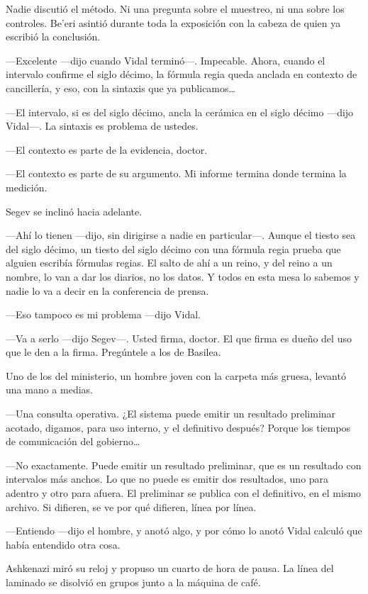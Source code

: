 Nadie discutió el método. Ni una pregunta sobre el muestreo, ni una sobre los controles. Be'eri asintió durante toda la exposición con la cabeza de quien ya escribió la conclusión.

---Excelente ---dijo cuando Vidal terminó---. Impecable. Ahora, cuando el intervalo confirme el siglo décimo, la fórmula regia queda anclada en contexto de cancillería, y eso, con la sintaxis que ya publicamos\ldots{}

---El intervalo, si es del siglo décimo, ancla la cerámica en el siglo décimo ---dijo Vidal---. La sintaxis es problema de ustedes.

---El contexto es parte de la evidencia, doctor.

---El contexto es parte de su argumento. Mi informe termina donde termina la medición.

Segev se inclinó hacia adelante.

---Ahí lo tienen ---dijo, sin dirigirse a nadie en particular---. Aunque el tiesto sea del siglo décimo, un tiesto del siglo décimo con una fórmula regia prueba que alguien escribía fórmulas regias. El salto de ahí a un reino, y del reino a un nombre, lo van a dar los diarios, no los datos. Y todos en esta mesa lo sabemos y nadie lo va a decir en la conferencia de prensa.

---Eso tampoco es mi problema ---dijo Vidal.

---Va a serlo ---dijo Segev---. Usted firma, doctor. El que firma es dueño del uso que le den a la firma. Pregúntele a los de Basilea.

Uno de los del ministerio, un hombre joven con la carpeta más gruesa, levantó una mano a medias.

---Una consulta operativa. ¿El sistema puede emitir un resultado preliminar acotado, digamos, para uso interno, y el definitivo después? Porque los tiempos de comunicación del gobierno\ldots{}

---No exactamente. Puede emitir un resultado preliminar, que es un resultado con intervalos más anchos. Lo que no puede es emitir dos resultados, uno para adentro y otro para afuera. El preliminar se publica con el definitivo, en el mismo archivo. Si difieren, se ve por qué difieren, línea por línea.

---Entiendo ---dijo el hombre, y anotó algo, y por cómo lo anotó Vidal calculó que había entendido otra cosa.

Ashkenazi miró su reloj y propuso un cuarto de hora de pausa. La línea del laminado se disolvió en grupos junto a la máquina de café.

